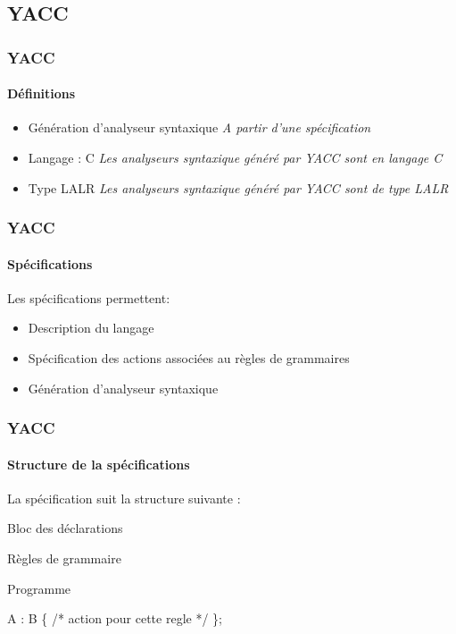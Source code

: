 \documentclass{beamer}
\begin{document}
\subsection{YACC}

\begin{frame}\frametitle{YACC}\framesubtitle{Définitions}

\begin{itemize}
			\item Génération d'analyseur syntaxique\newline
					\subitem \textit{A partir d'une spécification}\newline
			\item Langage : C\newline
					\subitem \textit{Les analyseurs syntaxique généré par YACC sont en langage C}\newline
			\item Type LALR\newline
					\subitem \textit{Les analyseurs syntaxique généré par YACC sont de type LALR}\newline
\end{itemize}

\end{frame}

\begin{frame}\frametitle{YACC}\framesubtitle{Spécifications}

Les spécifications permettent:

\begin{itemize}
			\item Description du langage\newline
			\item Spécification des actions associées au règles de grammaires\newline
			\item Génération d'analyseur syntaxique\newline
\end{itemize}

\end{frame}

\begin{frame}\frametitle{YACC}\framesubtitle{Structure de la spécifications}

La spécification suit la structure suivante :

Bloc des déclarations


Règles de grammaire


Programme

A : B \{ /* action pour cette regle */ \};

\end{frame}
\end{document}
